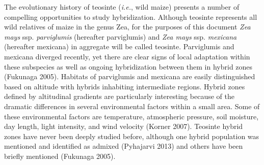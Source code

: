 \documentclass[12pt]{amsart}
\newcommand{\mbh}[1]{\textcolor{red}{ \emph{\scriptsize  #1}} }
\begin{document}
The evolutionary history of teosinte (\emph{i.e.}, wild maize) presents a number of compelling opportunities to study hybridization.
Although teosinte represents all wild relatives of maize in the genus {Zea}, for the purposes of this document \textit{Zea mays} ssp. \textit{parviglumis} (hereafter parviglumis) and \textit{Zea mays} ssp. \textit{mexicana} (hereafter mexicana) in aggregate will be called teosinte. 
Parviglumis and mexicana diverged recently, yet there are clear signs of local adaptation within these subspecies as well as ongoing hybridization between them in hybrid zones (Fukunaga 2005).
Habitats of parviglumis and mexicana are easily distinguished based on altitude with hybrids inhabiting intermediate regions.
Hybrid zones defined by altitudinal gradients are particularly interesting because of the dramatic differences in several environmental factors within a small area.
Some of these environmental factors are temperature, atmospheric pressure, soil moisture, day length, light intensity, and wind velocity (Korner 2007).
Teosinte hybrid zones have never been deeply studied before, although one hybrid population was mentioned and identified as admixed (Pyhajarvi 2013)  and others have been briefly mentioned (Fukunaga 2005).
\end{document}
